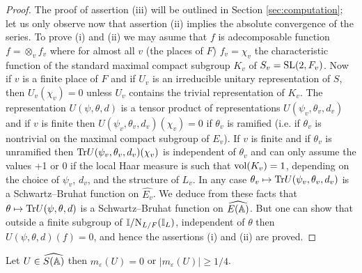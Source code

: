 \begin{proof}
The proof of assertion (iii) will be outlined in Section \ref{sec:computation}; let us only observe now that assertion (ii) implies the absolute convergence of the series.
To prove (i) and (ii) we may asume that $f$ is adecomposable function $f = \otimes_v f_v$ where for almost all $v$ (the places of $F$) $f_v = \chi_v$ the characteristic function of the standard maximal compact subgroup $K_v$ of $S_v = \mathrm{SL}(2, F_v)$.
Now if $v$ is a finite place of $F$ and if $U_v$ is an irreducible unitary representation of $S$, then $U_v(\chi_v) = 0$ unless $U_v$ contains the trivial representation of $K_v$.
The representation $U(\psi, \theta, d)$ is a tensor product of representations $U(\psi_v, \theta_v, d_v)$ and if $v$ is finite then $U(\psi_v, \theta_v, d_v)(\chi_v) = 0$ if $\theta_v$ is ramified (i.e. if $\theta_v$ is nontrivial on the maximal compact subgroup of $E_v$).
If $v$ is finite and if $\theta_v$ is unramified then $\mathrm{Tr} U(\psi_v, \theta_v, d_v)(\chi_v)$ is independent of $\theta_v$ and can only assume the values +1 or 0 if the local Haar measure is such that $\mathrm{vol}(K_v) = 1$, depending on the choice of $\psi_v$, $d_v$, and the structure of $L_v$.
In any case $\theta_v \mapsto \mathrm{Tr} U(\psi_v, \theta_v, d_v)$ is a Schwartz--Bruhat function on $\widehat{E_v}$.
We deduce from these facts that $\theta \mapsto \mathrm{Tr} U(\psi, \theta, d)$ is a Schwartz--Bruhat function on $\widehat{E(\mathbb{A})}$.
But one can show that outside a finite subgroup of $\mathbb{I} / \mathrm{N}_{L/F}(\mathbb{I}_L)$, independent of $\theta$ then $U(\psi, \theta, d)(f) = 0$, and hence the assertions (i) and (ii) are proved.
\end{proof}

\begin{corollary}
Let $U \in \widehat{S(\mathbb{A})}$ then $m_\varepsilon(U) = 0$ or $|m_\varepsilon(U)| \ge 1/4$.
\end{corollary}

